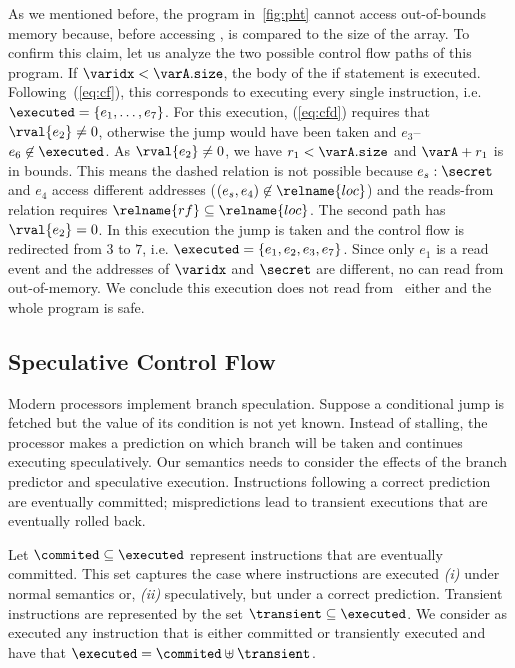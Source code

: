 \documentclass[conference]{IEEEtran}
\begin{document}
As we mentioned before, the program in~\autoref{fig:pht} cannot access out-of-bounds memory because, before accessing \varA, \varidx is compared to the size of the array.
To confirm this claim, let us analyze the two possible control flow paths of this program.
If $\varidx < \varA.\texttt{size}$, the body of the if statement is executed.
Following~(\ref{eq:cf}), this corresponds to executing every single instruction, i.e. $\executed = \{ e_1, \dots, e_7\}$.
For this execution, (\ref{eq:cfd}) requires that $\rval{e_2} \not = 0$, otherwise the jump would have been taken and $e_3$--$e_6 \not \in \executed$.
As $\rval{e_2} \not = 0$, we have $r_1 < \varA.\texttt{size}$ and $\varA + r_1$ is in bounds.
This means the dashed  relation is not possible because $e_s: \secret$ and $e_4$ access different addresses ($(e_s,e_4) \not \in \relname{loc}$) and the reads-from relation requires $\relname{rf} \subseteq \relname{loc}$.
The second path has $\rval{e_2} = 0$.
In this execution the jump is taken and the control flow is redirected from $3$ to $7$, i.e. $\executed = \{ e_1, e_2, e_3, e_7\}$.
Since only $e_1$ is a read event and the addresses of $\varidx$ and $\secret$ are different, no \load can read from out-of-memory.
We conclude this execution does not read from \secret\ either and the whole program is safe.

\subsection{Speculative Control Flow}
\label{sec:scf}

Modern processors implement branch speculation. 
Suppose a conditional jump is fetched  but the value of its condition is not yet known.
Instead of stalling, the processor makes a prediction on which branch will be taken and continues executing speculatively.
Our semantics needs to consider the effects of the branch predictor and speculative execution.
Instructions following a correct prediction are eventually committed; mispredictions lead to transient executions that are eventually rolled back.

Let $\commited \subseteq \executed$ represent instructions that are eventually committed.
This set captures the case where instructions are executed \emph{(i)} under normal semantics or, \emph{(ii)} speculatively, but under a correct prediction.
Transient instructions are represented by the set $\transient \subseteq \executed$.
We consider as executed any instruction that is either committed or transiently executed and have that
$\executed = \commited \uplus \transient$.
\end{document}
